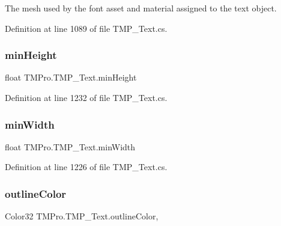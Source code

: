 The mesh used by the font asset and material assigned to the text object. 



Definition at line 1089 of file T\+M\+P\+\_\+\+Text.\+cs.

\mbox{\label{class_t_m_pro_1_1_t_m_p___text_aed588d5fd7ec93257c0be7894601d1df}} 
\subsubsection{\texorpdfstring{minHeight}{minHeight}}
{\footnotesize\ttfamily float T\+M\+Pro.\+T\+M\+P\+\_\+\+Text.\+min\+Height\hspace{0.3cm}{\ttfamily [get]}}







Definition at line 1232 of file T\+M\+P\+\_\+\+Text.\+cs.

\mbox{\label{class_t_m_pro_1_1_t_m_p___text_a33a9cad2c5d2664664fc4661729e831c}} 
\subsubsection{\texorpdfstring{minWidth}{minWidth}}
{\footnotesize\ttfamily float T\+M\+Pro.\+T\+M\+P\+\_\+\+Text.\+min\+Width\hspace{0.3cm}{\ttfamily [get]}}







Definition at line 1226 of file T\+M\+P\+\_\+\+Text.\+cs.

\mbox{\label{class_t_m_pro_1_1_t_m_p___text_a3aeff3153a0ba4bdaeca172f630ee047}} 
\subsubsection{\texorpdfstring{outlineColor}{outlineColor}}
{\footnotesize\ttfamily Color32 T\+M\+Pro.\+T\+M\+P\+\_\+\+Text.\+outline\+Color\hspace{0.3cm}{\ttfamily [get]}, {\ttfamily [set]}}



